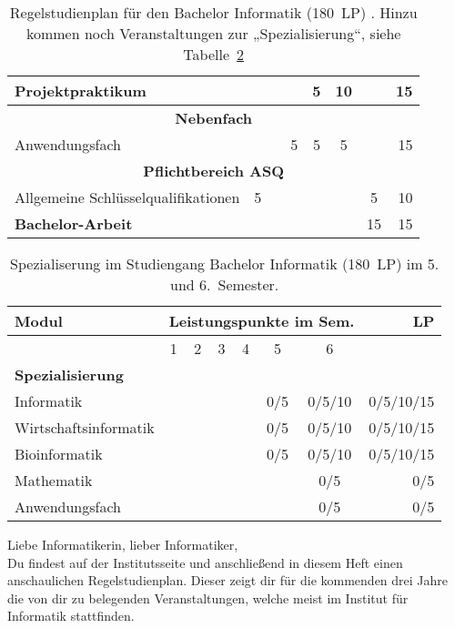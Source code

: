 \begin{table}[tbp]
\begin{small}
\begin{tabularx}{\textwidth}{|X||c|c|c|c|c|c||r|}
        Projektpraktikum&&&&5&10&&15\\\hline\hline
        \multicolumn{8}{|c|}{\textbf{Nebenfach}}\\\hline
        Anwendungsfach&&&5&5&5&&15\\\hline\hline
        \multicolumn{8}{|c|}{\textbf{Pflichtbereich ASQ}}\\\hline
        Allgemeine Schlüsselqualifikationen&5&&&&&5&10\\\hline\hline
        \textbf{Bachelor-Arbeit}&&&&&&15&15\\\hline
    \end{tabularx}
    \end{small}
    \caption{Regelstudienplan für den Bachelor Informatik (180~LP)
    \label{plan-info}. Hinzu kommen noch Veranstaltungen zur „Spezialisierung“, siehe Tabelle~\ref{plan-info2}}
\end{table}

\begin{table}[!th]
    \begin{small}
    \begin{tabularx}{\textwidth}{|X||c|c|c|c|c|c||r|}
        \hline
        \textbf{Modul}&\multicolumn{6}{l||}{\textbf{Leistungspunkte im Sem.}}&\textbf{LP}\\\hline
        &1&2&3&4&5&6&\\\hline\hline
        \multicolumn{8}{|X|}{\textbf{Spezialisierung}}\\\hline
        Informatik&&&&&0/5&0/5/10&0/5/10/15\\
        Wirtschaftsinformatik&&&&&0/5&0/5/10&0/5/10/15\\
        Bioinformatik&&&&&0/5&0/5/10&0/5/10/15\\
        Mathematik&&&&&&0/5&0/5\\
        Anwendungsfach&&&&&&0/5&0/5\\\hline
    \end{tabularx}
    \end{small}
    \caption{Spezialiserung im Studiengang Bachelor Informatik (180~LP) im 5. und 6.~Semester. \label{plan-info2}}
\end{table}

Liebe Informatikerin, lieber Informatiker,\\
Du findest auf der Institutsseite und anschließend in diesem Heft einen anschaulichen Regelstudienplan.
Dieser zeigt dir für die kommenden drei Jahre die von dir zu belegenden Veranstaltungen, welche meist im Institut für Informatik stattfinden.

